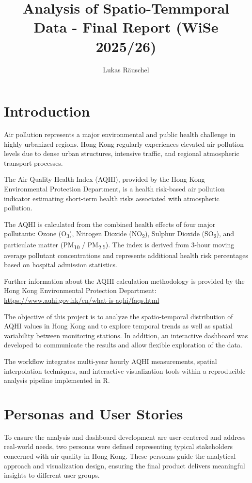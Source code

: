 \documentclass[manuscript,nonacm]{acmart}
\title{Analysis of Spatio-Temmporal Data - Final Report (WiSe 2025/26)}
\author{Lukas Räuschel}
\affiliation{%
  \institution{University of Münster}
  \city{Münster}
  \country{Germany}
}
\begin{document}
\maketitle



\section{Introduction}
    Air pollution represents a major environmental and public health challenge in highly urbanized regions. Hong Kong regularly experiences elevated air pollution levels due to dense urban structures, intensive traffic, and regional atmospheric transport processes.

    The Air Quality Health Index (AQHI), provided by the Hong Kong Environmental Protection Department, is a health risk-based air pollution indicator estimating short-term health risks associated with atmospheric pollution.

    The AQHI is calculated from the combined health effects of four major pollutants: Ozone (O\textsubscript{3}), Nitrogen Dioxide (NO\textsubscript{2}), Sulphur Dioxide (SO\textsubscript{2}), and particulate matter (PM\textsubscript{10} / PM\textsubscript{2.5}). The index is derived from 3-hour moving average pollutant concentrations and represents additional health risk percentages based on hospital admission statistics.

    Further information about the AQHI calculation methodology is provided by the Hong Kong Environmental Protection Department:
    \url{https://www.aqhi.gov.hk/en/what-is-aqhi/faqs.html}

    The objective of this project is to analyze the spatio-temporal distribution of AQHI values in Hong Kong and to explore temporal trends as well as spatial variability between monitoring stations. In addition, an interactive dashboard was developed to communicate the results and allow flexible exploration of the data.

    The workflow integrates multi-year hourly AQHI measurements, spatial interpolation techniques, and interactive visualization tools within a reproducible analysis pipeline implemented in R.

\section{Personas and User Stories}
    To ensure the analysis and dashboard development are user-centered and address real-world needs, two personas were defined representing typical stakeholders concerned with air quality in Hong Kong. These personas guide the analytical approach and visualization design, ensuring the final product delivers meaningful insights to different user groups.
\end{document}

